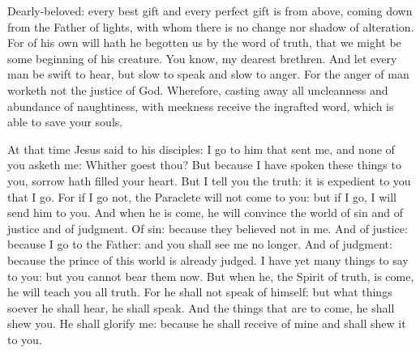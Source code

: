 


Dearly-beloved: every best gift and every perfect gift is from above, coming down from the
Father of lights, with whom there is no change nor shadow of alteration.  For
of his own will hath he begotten us by the word of truth, that we might be some
beginning of his creature.   You know, my dearest brethren. And let every
man be swift to hear, but slow to speak and slow to anger.  For the anger of
man worketh not the justice of God.  Wherefore, casting away all uncleanness
and abundance of naughtiness, with meekness receive the ingrafted word, which
is able to save your souls.



At that time Jesus said to his disciples:
I go to him that sent me, and none of you asketh me: Whither goest thou?
But because I have spoken these things to you, sorrow hath filled your heart.
But I tell you the truth: it is expedient to you that I go.  For if I go not,
the Paraclete will not come to you: but if I go, I will send him to you.  And
when he is come, he will convince the world of sin and of justice and of
judgment.   Of sin: because they believed not in me.  And
of justice: because I go to the Father: and you shall see me no longer.  And of
judgment: because the prince of this world is already judged.  I have yet many
things to say to you: but you cannot bear them now.  But when he, the Spirit of
truth, is come, he will teach you all truth. For he shall not speak of himself:
but what things soever he shall hear, he shall speak. And the things that are
to come, he shall shew you.   He shall glorify me: because he shall receive
of mine and shall shew it to you.



